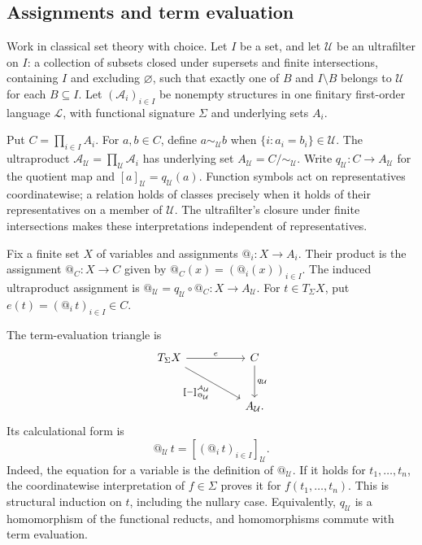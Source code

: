 \documentclass[11pt]{article}
\makeatletter
\newcommand{\llbracket}{\mathopen{[\mkern-3mu[}}
\newcommand{\rrbracket}{\mathclose{]\mkern-3mu]}}
\newcommand{\atsign}{\mathord{@}}
\theoremstyle{definition}
\makeatother
\begin{document}
\subsection{Assignments and term evaluation}

Work in classical set theory with choice. Let \(I\) be a set, and let
\(\mathcal U\) be an ultrafilter on \(I\): a collection of subsets closed
under supersets and finite intersections, containing \(I\) and excluding
\(\varnothing\), such that exactly one of \(B\) and \(I\setminus B\) belongs
to \(\mathcal U\) for each \(B\subseteq I\).
Let \((\mathcal A_i)_{i\in I}\) be nonempty structures in one finitary
first-order language \(\mathcal L\), with functional signature \(\Sigma\)
and underlying sets \(A_i\).

Put \(C=\prod_{i\in I}A_i\). For \(a,b\in C\), define
\(a\sim_{\mathcal U}b\) when
\(\{i:a_i=b_i\}\in\mathcal U\). The ultraproduct
\(\mathcal A_{\mathcal U}=\prod_{\mathcal U}\mathcal A_i\) has underlying
set \(A_{\mathcal U}=C/{\sim_{\mathcal U}}\). Write
\(q_{\mathcal U}:C\to A_{\mathcal U}\) for the quotient map and
\([a]_{\mathcal U}=q_{\mathcal U}(a)\). Function symbols act on
representatives coordinatewise; a relation holds of classes precisely when
it holds of their representatives on a member of \(\mathcal U\).
The ultrafilter's closure under finite intersections makes these
interpretations independent of representatives.

Fix a finite set \(X\) of variables and assignments
\(\atsign_i:X\to A_i\). Their product is the assignment
\(\atsign_C:X\to C\) given by
\(\atsign_C(x)=(\atsign_i(x))_{i\in I}\). The induced ultraproduct
assignment is
\(\atsign_{\mathcal U}=q_{\mathcal U}\circ\atsign_C:X\to A_{\mathcal U}\).
For \(t\in T_\Sigma X\), put
\(e(t)=(\atsign_i\,t)_{i\in I}\in C\).

The term-evaluation triangle is
\[
\begin{tikzcd}[row sep=large,column sep=huge]
T_\Sigma X \arrow[r,"e"]
  \arrow[dr,"\llbracket-\rrbracket^{\mathcal A_{\mathcal U}}_{\atsign_{\mathcal U}}"'] &
C \arrow[d,"q_{\mathcal U}"] \\
& A_{\mathcal U}.
\end{tikzcd}
\]
Its calculational form is
\[
\boxed{\atsign_{\mathcal U}\,t
=[(\atsign_i\,t)_{i\in I}]_{\mathcal U}.}
\]
Indeed, the equation for a variable is the definition of
\(\atsign_{\mathcal U}\). If it holds for \(t_1,\ldots,t_n\), the
coordinatewise interpretation of \(f\in\Sigma\) proves it for
\(f(t_1,\ldots,t_n)\). This is structural induction on \(t\), including
the nullary case. Equivalently, \(q_{\mathcal U}\) is a homomorphism of
the functional reducts, and homomorphisms commute with term evaluation.
\end{document}
